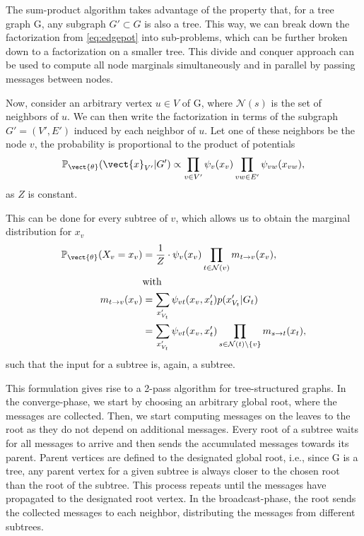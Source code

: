 The sum-product algorithm takes advantage of the property that, for a tree graph G, any subgraph $G' \subset G$ is also a tree. 
This way, we can break down the factorization from \autoref{eq:edgepot} into sub-problems, which can be further broken down to a factorization on a smaller tree.
This divide and conquer approach can be used to compute all node marginals simultaneously and in parallel by passing messages between nodes.

Now, consider an arbitrary vertex $u \in V$ of G, where $\mathcal{N}(s)$ is the set of neighbors of $u$.
We can then write the factorization in terms of the subgraph $G'=(V', E')$ induced by each neighbor of $u$. 
Let one of these neighbors be the node $v$, the probability is proportional to the product of potentials
\begin{equation}
    \mathbb{P}_{\vect{\theta}}(\vect{x}_{V'}\lvert G') \propto \prod_{v \in V'} \psi_v(x_v) \prod_{vw \in E'} \psi_{vw}(x_{vw}),
\end{equation}
as $Z$ is constant.

This can be done for every subtree of $v$, which allows us to obtain the marginal distribution for $x_v$
\begin{equation}
    \label{eq:normbp}
    \begin{split}
    \mathbb{P}_{\vect{\theta}}(X_v = x_v) &= \frac{1}{Z} \cdot \psi_v(x_v) \prod_{t \in \mathcal{N}(v)} m_{t \rightarrow v}(x_v),  \\
    & \text{with}\\
    m_{t \rightarrow v}(x_v) &= \sum_{x'_{V_t}} \psi_{vt}(x_v, x_t') p(x'_{V_t} \lvert G_t) \\
    & = \sum_{x'_{V_t}} \psi_{vt}(x_v, x_t')  \prod_{s\in \mathcal{N}(t) \setminus \{v\}} m_{s \rightarrow t}(x_t),
    \end{split}
\end{equation}
such that the input for a subtree is, again, a subtree.

This formulation gives rise to a 2-pass algorithm for tree-structured graphs.
In the converge-phase, we start by choosing an arbitrary global root, where the messages are collected.
Then, we start computing messages on the leaves \wrt to the root as they do not depend on additional messages.
Every root of a subtree waits for all messages to arrive and then sends the accumulated messages towards its parent. 
Parent vertices are defined \wrt to the designated global root, i.e., since G is a tree, any parent vertex for a given subtree is always closer to the chosen root than the root of the subtree.
This process repeats until the messages have propagated to the designated root vertex.
In the broadcast-phase, the root sends the collected messages to each neighbor, distributing the messages from different subtrees.

